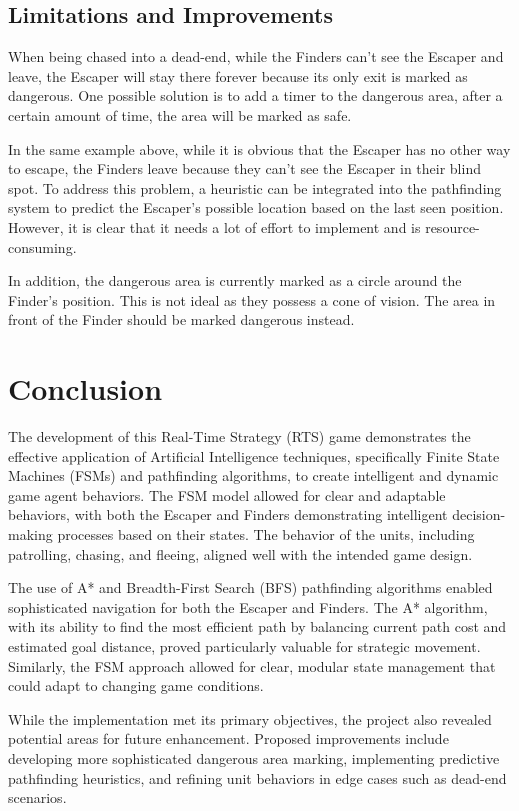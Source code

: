 \documentclass[a4paper,12pt]{article}
\begin{document}
\subsection{Limitations and Improvements}
When being chased into a dead-end, while the Finders can't see the Escaper and leave, the Escaper will stay there forever because its only exit is marked as dangerous.
One possible solution is to add a timer to the dangerous area, after a certain amount of time, the area will be marked as safe.

In the same example above, while it is obvious that the Escaper has no other way to escape, the Finders leave because they can't see the Escaper in their blind spot.
To address this problem, a heuristic can be integrated into the pathfinding system to predict the Escaper's possible location based on the last seen position.
However, it is clear that it needs a lot of effort to implement and is resource-consuming.

In addition, the dangerous area is currently marked as a circle around the Finder's position.
This is not ideal as they possess a cone of vision.
The area in front of the Finder should be marked dangerous instead.



\section{Conclusion}
The development of this Real-Time Strategy (RTS) game demonstrates the effective application of Artificial Intelligence techniques, specifically Finite State Machines (FSMs) and pathfinding algorithms, to create intelligent and dynamic game agent behaviors. 
The FSM model allowed for clear and adaptable behaviors, with both the Escaper and Finders demonstrating intelligent decision-making processes based on their states. The behavior of the units, including patrolling, chasing, and fleeing, aligned well with the intended game design.

The use of A* and Breadth-First Search (BFS) pathfinding algorithms enabled sophisticated navigation for both the Escaper and Finders. The A* algorithm, with its ability to find the most efficient path by balancing current path cost and estimated goal distance, proved particularly valuable for strategic movement. Similarly, the FSM approach allowed for clear, modular state management that could adapt to changing game conditions.

While the implementation met its primary objectives, the project also revealed potential areas for future enhancement. Proposed improvements include developing more sophisticated dangerous area marking, implementing predictive pathfinding heuristics, and refining unit behaviors in edge cases such as dead-end scenarios.
\end{document}
